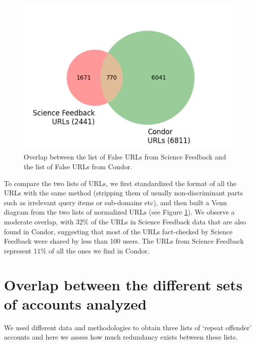\documentclass[review]{elsarticle}
\begin{document}
{{\begin{figure}[!h]
\centering
\includegraphics[scale=0.5]{./../figure/supplementary_venn_urls.png}
\caption{
Overlap between the list of False URLs from Science Feedback and the list of False URLs from Condor.
}
\label{venn_urls}
\end{figure}

To compare the two lists of URLs, we first standardized the format of all the URLs with the same method (stripping them of usually non-discriminant parts such as irrelevant query items or sub-domains etc), and then built a Venn diagram from the two lists of normalized URLs (see Figure \ref{venn_urls}). 
We observe a moderate overlap, with $32\%$ of the URLs in Science Feedback data that are also found in Condor, suggesting that most of the URLs fact-checked by Science Feedback were shared by less than 100 users. 
The URLs from Science Feedback represent $11\%$ of all the ones we find in Condor.

\section*{Overlap between the different sets of accounts analyzed}

We used different data and methodologies to obtain three lists of `repeat offender' accounts and here we assess how much redundancy exists between these lists. 

}}
\end{document}
